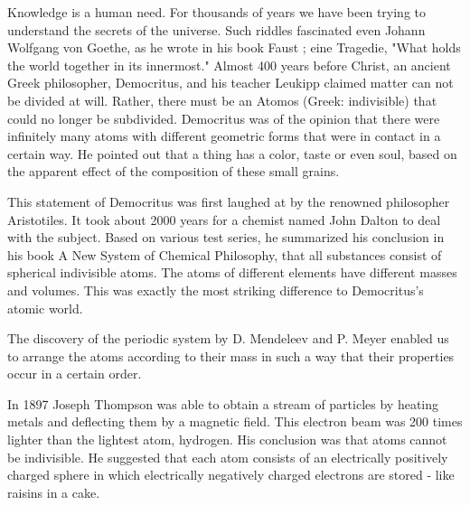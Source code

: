 
Knowledge is a human need. For thousands of years we have been trying to understand the secrets of the universe. Such riddles fascinated even Johann Wolfgang von Goethe, as he wrote in his book Faust \cite{goethe1921faust}; eine Tragedie, "What holds the world together in its innermost." 
Almost 400 years before Christ, an ancient Greek philosopher, Democritus, and his teacher Leukipp claimed matter can not be divided at will. Rather, there must be an Atomos (Greek: indivisible) that could no longer be subdivided.
Democritus was of the opinion that there were infinitely many atoms with different geometric forms that were in contact in a certain way. He pointed out that a thing has a color, taste or even soul, based on the apparent effect of the composition of these small grains.
\cite{capelle1968vorsokratiker}

This statement of Democritus was first laughed at by the renowned philosopher Aristotiles. It took about 2000 years for a chemist named John Dalton to deal with the subject. Based on various test series, he summarized his conclusion in his book A New System of Chemical Philosophy, that all substances consist of spherical indivisible atoms. The atoms of different elements have different masses and volumes. This was exactly the most striking difference to Democritus's atomic world.\cite{dalton2010new}

The discovery of the periodic system by D. Mendeleev and P. Meyer enabled us to arrange the atoms according to their mass in such a way that their properties occur in a certain order.\cite{haken2013atom}

In 1897 Joseph Thompson was able to obtain a stream of particles by heating metals and deflecting them by a magnetic field. This electron beam was 200 times lighter than the lightest atom, hydrogen.
His conclusion was that atoms cannot be indivisible. He suggested that each atom consists of an electrically positively charged sphere in which electrically negatively charged electrons are stored - like raisins in a cake.

